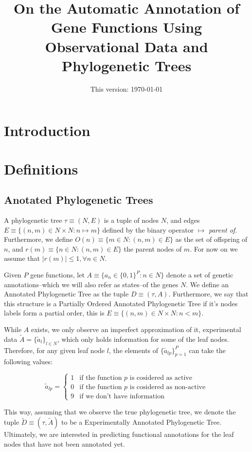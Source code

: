 \documentclass{article}
\title{On the Automatic Annotation of Gene Functions Using Observational Data and Phylogenetic Trees}
\date{This version: \today}
\begin{document}
\maketitle

\section{Introduction}

\section{Definitions}

\subsection{Anotated Phylogenetic Trees}

A phylogenetic tree $\tau\equiv (N,E)$ is a tuple of nodes $N$, and edges $E\equiv \{(n, m) \in N\times N: n\mapsto m\}$ defined by the binary operator $\mapsto$ \emph{parent of}. Furthermore, we define $O(n)\equiv\{m\in N: (n, m) \in E\}$ as the set of offspring of $n$, and $r(m) \equiv\{n \in N: (n, m) \in E\}$ the parent nodes of $m$. For now on we assume that $|r(m)| \leq 1,\forall n\in N$. 

Given $P$ gene functions, let $A \equiv \{a_n \in \{0,1\}^P: n\in N\}$ denote a set of genetic annotations--which we will also refer as states--of the genes $N$. We define an Annotated Phylogenetic Tree as the tuple $D \equiv(\tau, A)$. Furthermore, we say that this structure is a Partially Ordered Annotated Phylogenetic Tree if it's nodes labels form a partial order, this is $E\equiv \{(n, m) \in N\times N: n < m\}$.

While $A$ exists, we only observe an imperfect approximation of it, experimental data $\tilde A = \{\tilde a_l\}_{l\in N}$, which only holds information for some of the leaf nodes. Therefore, for any given leaf node $l$, the elements of $\{\tilde a_{lp}\}_{p=1}^P$ can take the following values:

$$
\tilde a_{lp} = \left\{
\begin{array}{ll}
1 & \mbox{if the function }p\mbox{ is cosidered as active}\\
0 & \mbox{if the function }p\mbox{ is cosidered as non-active}\\
9 & \mbox{if we don't have information }
\end{array}\right.
$$

This way, assuming that we observe the true phylogenetic tree, we denote the tuple $\tilde D\equiv(\tau, \tilde A)$ to be a Experimentally Annotated Phylogenetic Tree. Ultimately, we are interested in predicting functional annotations for the leaf nodes that have not been annotated yet.
\end{document}
